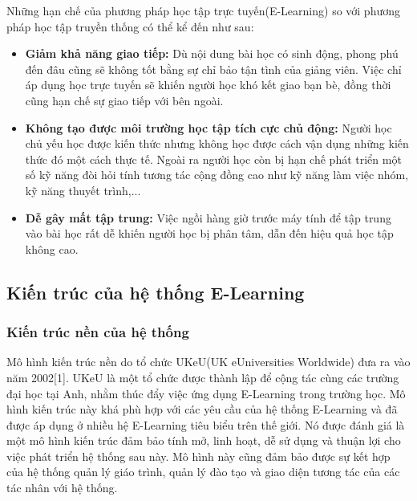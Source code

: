 	Những hạn chế của phương pháp học tập trực tuyến(E-Learning) so với phương pháp học tập truyền thống có thể kể đến như sau:

	\begin{itemize}
		
		\item \textbf{Giảm khả năng giao tiếp:} Dù nội dung bài học có sinh động, phong phú đến đâu cũng sẽ không tốt bằng sự chỉ bảo tận tình của giảng viên. Việc chỉ áp dụng học trực tuyến sẽ khiến người học khó kết giao bạn bè, đồng thời cũng hạn chế sự giao tiếp với bên ngoài.
	
		\item \textbf{Không tạo được môi trường học tập tích cực chủ động:} Người học chủ yếu học được kiến thức nhưng không học được cách vận dụng những kiến thức đó một cách thực tế. Ngoài ra người học còn bị hạn chế phát triển một số kỹ năng đòi hỏi tính tương tác cộng đồng cao như kỹ năng làm việc nhóm, kỹ năng thuyết trình,...
	
		\item \textbf{Dễ gây mất tập trung:} Việc ngồi hàng giờ trước máy tính để tập trung vào bài học rất dễ khiến người học bị phân tâm, dẫn đến hiệu quả học tập không cao.
		
	\end{itemize}

\newpage

\subsection{Kiến trúc của hệ thống E-Learning}

\subsubsection{Kiến trúc nền của hệ thống}

	Mô hình kiến trúc nền do tổ chức UKeU(UK eUniversities Worldwide) đưa ra vào năm 2002[1]. UKeU là một tổ chức được thành lập để cộng tác cùng các trường đại học tại Anh, nhằm thúc đẩy việc ứng dụng E-Learning trong trường học. Mô hình kiến trúc này khá phù hợp với các yêu cầu của hệ thống E-Learning và đã được áp dụng ở nhiều hệ E-Learning tiêu biểu trên thế giới. Nó được đánh giá là một mô hình kiến trúc đảm bảo tính mở, linh hoạt, dễ sử dụng và thuận lợi cho việc phát triển hệ thống sau này. Mô hình này cũng đảm bảo được sự kết hợp của hệ thống quản lý giáo trình, quản lý đào tạo và giao diện tương tác của các tác nhân với hệ thống. \\

